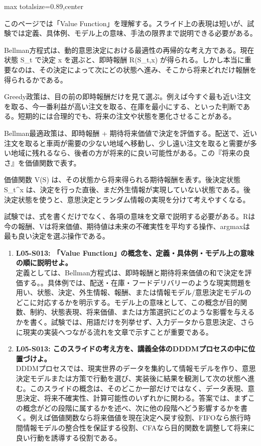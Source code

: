 \begin{minipage}[t]{0.58\textwidth}
\begin{adjustbox}{max totalsize={\textwidth}{0.89\textheight},center}
\begin{minipage}{\textwidth}\scriptsize
{}このページでは「Value Function」を理解する。スライド上の表現は短いが、試験では定義、具体例、モデル上の意味、手法の限界まで説明できる必要がある。\par
Bellman方程式は、動的意思決定における最適性の再帰的な考え方である。現在状態 S\_t で決定 x を選ぶと、即時報酬 R(S\_t,x) が得られる。しかし本当に重要なのは、その決定によって次にどの状態へ進み、そこから将来どれだけ報酬を得られるかである。\par
Greedy政策は、目の前の即時報酬だけを見て選ぶ。例えば今すぐ最も近い注文を取る、今一番利益が高い注文を取る、在庫を最小にする、といった判断である。短期的には合理的でも、将来の注文や状態を悪化させることがある。\par
Bellman最適政策は、即時報酬 + 期待将来価値で決定を評価する。配送で、近い注文を取ると車両が需要の少ない地域へ移動し、少し遠い注文を取ると需要が多い地域に残れるなら、後者の方が将来的に良い可能性がある。この『将来の良さ』を価値関数で表す。\par
価値関数 V(S) は、その状態から将来得られる期待報酬を表す。後決定状態 S\_t\textasciicircum{}x は、決定を行った直後、まだ外生情報が実現していない状態である。後決定状態を使うと、意思決定とランダム情報の実現を分けて考えやすくなる。\par
試験では、式を書くだけでなく、各項の意味を文章で説明する必要がある。Rは今の報酬、Vは将来価値、期待値は未来の不確実性を平均する操作、argmaxは最も良い決定を選ぶ操作である。\par{}\begin{enumerate}\item \textbf{L05-S013: 「Value Function」の概念を、定義・具体例・モデル上の意味の順に説明せよ。}\\定義としては、Bellman方程式は、即時報酬と期待将来価値の和で決定を評価する。。具体例では、配送・在庫・フードデリバリーのような現実問題を用い、状態、決定、外生情報、報酬、または情報モデル/意思決定モデルのどこに対応するかを明示する。モデル上の意味として、この概念が目的関数、制約、状態表現、将来価値、または方策選択にどのような影響を与えるかを書く。試験では、用語だけを列挙せず、入力データから意思決定、さらに現実の実装へつながる流れを文章で示すことが重要である。\item \textbf{L05-S013: このスライドの考え方を、講義全体のDDDMプロセスの中に位置づけよ。}\\DDDMプロセスでは、現実世界のデータを集約して情報モデルを作り、意思決定モデルまたは方策で行動を選び、実装後に結果を観測して次の状態へ進む。このスライドの概念は、そのどこか一部だけではなく、データ表現、意思決定、将来不確実性、計算可能性のいずれかに関わる。答案では、まずこの概念がどの段階に属するかを述べ、次に他の段階へどう影響するかを書く。例えば価値関数なら将来価値を現在決定へ戻す役割、FIFOなら旅行時間情報モデルの整合性を保証する役割、CFAなら目的関数を調整して将来に良い行動を誘導する役割である。\end{enumerate}

\end{minipage}
\end{adjustbox}
\end{minipage}
